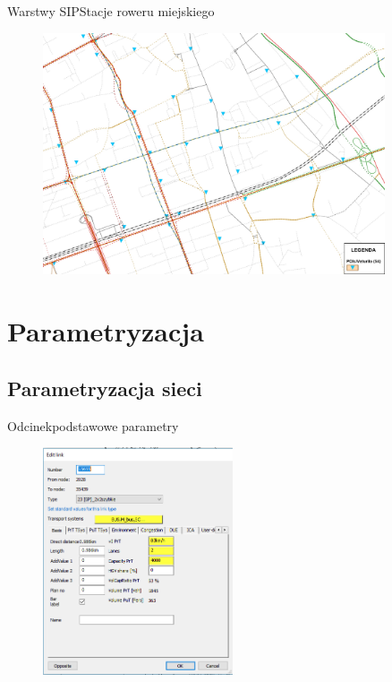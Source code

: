 \documentclass[8pt]{beamer}
\begin{document}
\begin{frame}{Warstwy SIP}{Stacje roweru miejskiego}
\begin{figure}\begin{center}
\includegraphics[width=0.9\textwidth]{bike}
 \end{center}  \end{figure} 
\end{frame}

\section{Parametryzacja}
\subsection{Parametryzacja sieci}
\begin{frame}{Odcinek}{podstawowe parametry}
\begin{figure}\begin{center}
\includegraphics[width=0.5\textwidth]{link}
 \end{center}  \end{figure} 
\end{frame}
\end{document}
